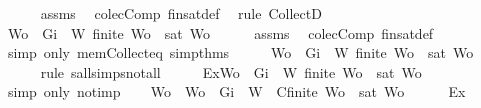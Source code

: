\begin{isabellebody}
\ \ \ \ \isamarkupfalse%
\ assms{\isacharparenleft}{}{\isacharparenright}\ \isamarkupfalse%
\ colecComp\ fin{\isacharunderscore}sat{\isacharunderscore}def\ \isamarkupfalse%
\ {\isacharparenleft}rule\ CollectD{\isacharparenright}\ \isanewline
\ \ \isamarkupfalse%
\ {\isachardoublequoteopen}{\isasymnot}{\isacharparenleft}{\isasymforall}Wo\ {\isasymsubseteq}\ {\isacharbraceleft}Gi{\isacharbraceright}\ {\isasymunion}\ W{\isachardot}\ finite\ Wo\ {\isasymlongrightarrow}\ sat\ Wo{\isacharparenright}{\isachardoublequoteclose}\isanewline
\ \ \ \ \isamarkupfalse%
\ assms{\isacharparenleft}{}{\isacharparenright}\ \isamarkupfalse%
\ colecComp\ fin{\isacharunderscore}sat{\isacharunderscore}def\ \isamarkupfalse%
\ {\isacharparenleft}simp\ only{\isacharcolon}\ mem{\isacharunderscore}Collect{\isacharunderscore}eq\ simp{\isacharunderscore}thms{\isacharparenleft}{}{\isacharparenright}{\isacharparenright}\isanewline
\ \ \isamarkupfalse%
\ \isamarkupfalse%
\ {\isachardoublequoteopen}{\isasymexists}Wo\ {\isasymsubseteq}\ {\isacharbraceleft}Gi{\isacharbraceright}\ {\isasymunion}\ W{\isachardot}\ {\isasymnot}{\isacharparenleft}finite\ Wo\ {\isasymlongrightarrow}\ sat\ Wo{\isacharparenright}{\isachardoublequoteclose}\isanewline
\ \ \ \ \isamarkupfalse%
\ {\isacharparenleft}rule\ sall{\isacharunderscore}simps{\isacharunderscore}not{\isacharunderscore}all{\isacharparenright}\isanewline
\ \ \isamarkupfalse%
\ \isamarkupfalse%
\ Ex{}{\isacharcolon}{\isachardoublequoteopen}{\isasymexists}Wo\ {\isasymsubseteq}\ {\isacharbraceleft}Gi{\isacharbraceright}\ {\isasymunion}\ W{\isachardot}\ finite\ Wo\ {\isasymand}\ {\isasymnot}{\isacharparenleft}sat\ Wo{\isacharparenright}{\isachardoublequoteclose}\isanewline
\ \ \ \ \isamarkupfalse%
\ {\isacharparenleft}simp\ only{\isacharcolon}\ not{\isacharunderscore}imp{\isacharparenright}\isanewline
\ \ \isamarkupfalse%
\ Wo\ \ {\isachardoublequoteopen}Wo\ {\isasymsubseteq}\ {\isacharbraceleft}Gi{\isacharbraceright}\ {\isasymunion}\ W{\isachardoublequoteclose}\ \ C{}{\isacharcolon}{\isachardoublequoteopen}finite\ Wo\ {\isasymand}\ {\isasymnot}{\isacharparenleft}sat\ Wo{\isacharparenright}{\isachardoublequoteclose}\isanewline
\ \ \ \ \isamarkupfalse%
\ Ex{}\ \isamarkupfalse%

\end{isabellebody}
